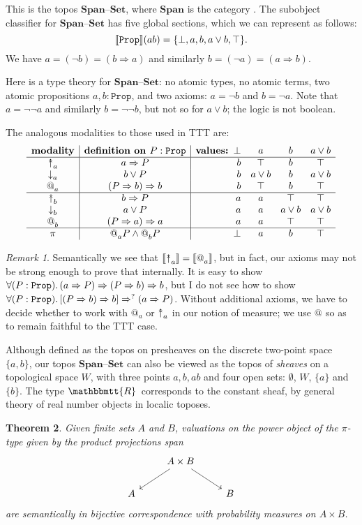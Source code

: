 \documentclass[11pt, oneside, article]{memoir}
\makeatletter
\theoremstyle{plain}
\newtheorem{theorem}{Theorem}[chapter] %
\theoremstyle{definition}
\theoremstyle{remark}
\newtheorem{remark}[theorem]{Remark}
\DeclarePairedDelimiter{\church}{\llbracket}{\rrbracket}
\newcommand{\const}[1]{\mathtt{#1}}
\newcommand{\Cat}[1]{\mathbf{#1}}
\newcommand{\smset}{\Cat{Set}}
\newcommand{\from}{\leftarrow}
\newcommand{\internal}[1]{\raisebox{-.03ex}{$\mathbbmtt{#1}$}}
\newcommand{\hs}{\hspace{1.1pt}}
\newcommand{\tRR}{\internal{R}\hs}
\newcommand{\Prop}{\const{Prop}}
\newcommand{\AtSymbol}{{@}}
\newcommand{\SeeSymbol}{{\down}}  %
\newcommand{\InSymbol}{{\upclose}}%
\newcommand{\At}[2][]{\AtSymbol^{#1}_{#2}}
\newcommand{\See}[2][]{\SeeSymbol^{#1}_{#2}}
\newcommand{\In}[2][]{\InSymbol^{#1}_{#2}}
\newcommand{\upclose}{{\rotatebox[origin=c]{90}{$\twoheadrightarrow$}}}
\newcommand{\down}{\mathord{\downarrow}}
\newcommand{\imp}{\Rightarrow}
\newcommand{\Span}{\Cat{Span}}
\newcommand{\set}{\text{--}\smset}
\makeatother
\begin{document}
This is the topos $\Span\set$, where $\Span$ is the category \fbox{$a\from ab\to b$}. The subobject classifier for $\Span\set$ has five global sections, which we can represent as follows:
\[\church{\Prop}(ab)=\{\bot,a,b,a\vee b,\top\}.\]
We have $a=(\neg b)=(b\imp a)$ and similarly $b=(\neg a)=(a\imp b)$.

Here is a type theory for $\Span\set$: no atomic types, no atomic terms, two atomic propositions $a,b:\Prop$, and two axioms: $a=\neg b$ and $b=\neg a$. Note that $a=\neg\neg a$ and similarly $b=\neg\neg b$, but not so for $a\vee b$; the logic is not boolean.

The analogous modalities to those used in TTT are:
\[
\begin{array}{c|c|rccc}
	\textbf{modality}&\textbf{definition on } P:\Prop&\textbf{values: }\bot&a&b&a\vee b \\\hline
	\In{a}&a\imp P&b&\top&b&\top\\
	\See{a}&b\vee P&b&a\vee b&b&a\vee b\\
	\At{a}&(P\imp b)\imp b&b&\top&b&\top\\\hline
	\In{b}&b\imp P&a&a&\top&\top\\
	\See{b}&a\vee P&a&a&a\vee b&a\vee b\\
	\At{b}&(P\imp a)\imp a&a&a&\top&\top\\\hline
	\pi&\At{a}P\wedge\At{b}P&\bot&a&b&\top
\end{array}
\]

\begin{remark}
Semantically we see that $\church{\In{a}}=\church{\At{a}}$, but in fact, our axioms may not be strong enough to prove that internally. It is easy to show $\forall(P:\Prop)\ldotp(a\imp P)\imp(P\imp b)\imp b$, but I do not see how to show $\forall(P:\Prop)\ldotp[(P\imp b)\imp b]\imp^? (a\imp P)$. Without additional axioms, we have to decide whether to work with $\At{a}$ or $\In{a}$ in our notion of measure; we use $\At{}$ so as to remain faithful to the TTT case. 
\end{remark}

Although defined as the topos on presheaves on the discrete two-point space $\{a,b\}$, our topos $\Span\set$ can also be viewed as the topos of \emph{sheaves} on a topological space $W$, with three points $a,b,ab$ and four open sets: $\emptyset$, $W$, $\{a\}$ and $\{b\}$. The type $\tRR$ corresponds to the constant sheaf, by general theory of real number objects in localic toposes.

\begin{theorem}
Given finite sets $A$ and $B$, valuations on the power object of the $\pi$-type given by the product projections span
\[\begin{tikzcd}
	& A \times B \ar{dl} \ar{dr} \\
	A & & B
\end{tikzcd}\]
are semantically in bijective correspondence with probability measures on $A\times B$.
\end{theorem}
\end{document}
